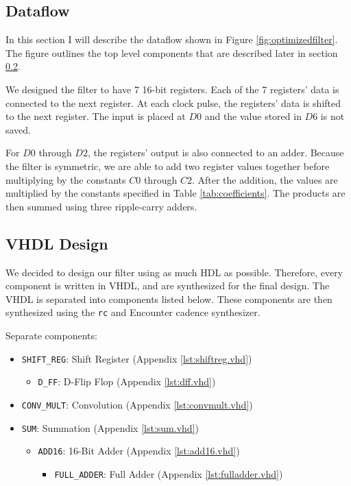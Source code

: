 
\subsection{Dataflow}
In this section I will describe the dataflow shown in Figure \ref{fig:optimizedfilter}.  The figure outlines the top level components that are described later in section \ref{sec:vhdldesign}.  

We designed the filter to have 7 16-bit registers.  Each of the 7 registers' data is connected to the next register.  At each clock pulse, the registers' data is shifted to the next register. The input is placed at $D0$ and the value stored in $D6$ is not saved.

For $D0$ through $D2$, the registers' output is also connected to an adder.  Because the filter is symmetric, we are able to add two register values together before multiplying by the constants $C0$ through $C2$.  After the addition, the values are multiplied by the constants specified in Table \ref{tab:coefficients}.  The products are then summed using three ripple-carry adders.


\subsection{VHDL Design}
\label{sec:vhdldesign}
We decided to design our filter using as much HDL as possible.  Therefore, every component is written in VHDL, and are synthesized for the final design. The VHDL is separated into components listed below.  These components are then synthesized using the \texttt{rc} and Encounter cadence synthesizer.  

Separate components:
\begin{itemize}
\item \verb=SHIFT_REG=: Shift Register (Appendix \ref{lst:shiftreg.vhd})
	\begin{itemize}
		\item \verb=D_FF=: D-Flip Flop (Appendix \ref{lst:dff.vhd})
	\end{itemize}
\item \verb=CONV_MULT=: Convolution (Appendix \ref{lst:convmult.vhd})
\item \verb=SUM=: Summation (Appendix \ref{lst:sum.vhd})
	\begin{itemize}
		\item \verb=ADD16=: 16-Bit Adder (Appendix \ref{lst:add16.vhd})
		\begin{itemize}
			\item \verb=FULL_ADDER=: Full Adder (Appendix \ref{lst:fulladder.vhd})
		\end{itemize}
	\end{itemize}
\end{itemize}

